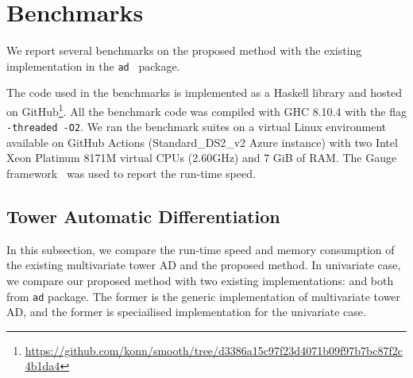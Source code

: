 \documentclass[rims-smooth-paper.tex]{subfiles}
\begin{document}
\section{Benchmarks}
\label{sec:bench}
We report several benchmarks on the proposed method with the existing implementation in the \texttt{ad}~\cite{Kmett:2010aa} package.

The code used in the benchmarks is implemented as a Haskell library and hosted on GitHub\footnote{\url{https://github.com/konn/smooth/tree/d3386a15c97f23d4071b09f97b7bc87f2c4b1da4}}.
All the benchmark code was compiled with GHC 8.10.4 with the flag \texttt{-threaded -O2}.
We ran the benchmark suites on a virtual Linux environment available on GitHub Actions (Standard\_DS2\_v2 Azure instance) with two Intel Xeon Platinum 8171M virtual CPUs (2.60GHz) and 7 GiB of RAM.
The Gauge framework~\cite{Hanquez:2019wk} was used to report the run-time speed.

\subsection{Tower Automatic Differentiation}
In this subsection, we compare the run-time speed and memory consumption of the existing multivariate tower AD and the proposed method.
In univariate case, we compare our proposed method with two existing implementations:  and  both from \texttt{ad} package.
The former is the generic implementation of multivariate tower AD, and the former is speciailised implementation for the univariate case.
\end{document}
